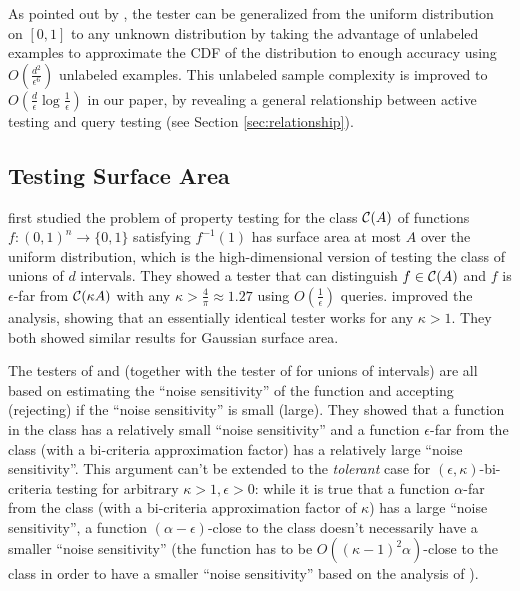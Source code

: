 As pointed out by \citet{BBBY12}, the tester can be generalized from the uniform distribution on $[0,1]$ to any unknown distribution by taking the advantage of unlabeled examples to approximate the CDF of the distribution to enough accuracy using $O(\frac{d^2}{\epsilon^6})$ unlabeled examples. This unlabeled sample complexity is improved to $O(\frac{d}{\epsilon}\log\frac{1}{\epsilon})$ in our paper, by revealing a general relationship between active testing and query testing (see Section \ref{sec:relationship}).



\subsection {Testing Surface Area}
\label{subsec:surfacearea}
\citet{KNOW13} first studied the problem of property testing for the class ${\mathcal{C}}(A)$ of functions $f:(0,1)^n\rightarrow\{0,1\}$ satisfying $f^{-1}(1)$ has surface area at most $A$ over the uniform distribution, which is the high-dimensional version of testing the class of unions of $d$ intervals. They showed a tester that can distinguish $f\in{\mathcal{C}}(A)$ and $f$ is $\epsilon$-far from ${\mathcal{C}}(\kappa A)$ with any $\kappa>\frac{4}{\pi}\approx 1.27$ using $O(\frac 1\epsilon)$ queries. \citet{Nee14} improved the analysis, showing that an essentially identical tester works for any $\kappa>1$. They both showed similar results for Gaussian surface area. 

The testers of \citet{KNOW13} and \citet{Nee14} (together with the tester of \citet{BBBY12} for unions of intervals) are all based on estimating the ``noise sensitivity'' of the function and accepting (rejecting) if the ``noise sensitivity'' is small (large). They showed that a function in the class has a relatively small ``noise sensitivity'' and a function $\epsilon$-far from the class (with a bi-criteria approximation factor) has a relatively large ``noise sensitivity''. This argument can't be extended to the \emph{tolerant} case for $(\epsilon,\kappa)$-bi-criteria testing for arbitrary $\kappa>1,\epsilon>0$: while it is true that a function $\alpha$-far from the class (with a bi-criteria approximation factor of $\kappa$) has a large ``noise sensitivity'', a function $(\alpha-\epsilon)$-close to the class doesn't necessarily have a smaller ``noise sensitivity'' (the function has to be $O((\kappa-1)^2\alpha)$-close to the class in order to have a smaller ``noise sensitivity'' based on the analysis of \citet{Nee14}).


